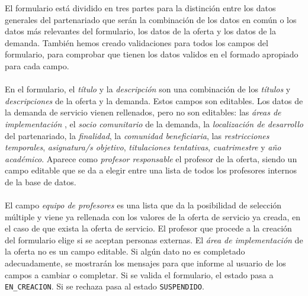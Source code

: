 \documentclass[11pt]{book}
\begin{document}
	El formulario está dividido en tres partes para la distinción entre los datos generales del partenariado que serán la combinación de los datos en común o los datos más relevantes del formulario, los datos de la oferta y los datos de la demanda. También hemos creado validaciones para todos los campos del formulario, para comprobar que tienen los datos validos en el formado apropiado para cada campo.\\\\
	En el formulario, el \emph{título} y la \emph{descripción } son una combinación de los \emph{títulos} y \emph{descripciones} de la oferta y la demanda. Estos campos son editables. Los datos de la demanda de servicio vienen rellenados, pero no son editables:  las \emph{áreas de implementación} , el \emph{socio comunitario} de la demanda, la \emph{localización de desarrollo} del partenariado, la \emph{finalidad}, la \emph{comunidad beneficiaria}, las \emph{restricciones temporales}, \emph{asignatura/s objetivo}, \emph{titulaciones tentativas}, \emph{cuatrimestre} y \emph{año académico}. Aparece como \emph{profesor responsable} el profesor de la oferta, siendo un campo editable que se da a elegir entre una lista de todos los profesores internos de la base de datos.\\\\
	El campo \emph{equipo de profesores} es una lista que da la posibilidad de selección múltiple y viene ya rellenada con los valores de la oferta de servicio ya creada, en el caso de que exista la oferta de servicio. El profesor que procede a la creación del formulario elige si se aceptan personas externas. El \emph{área de implementación} de la oferta no es un campo editable. Si algún dato no es completado adecuadamente, se mostrarán los mensajes para que informe al usuario de los campos a cambiar o completar. Si se valida el formulario, el estado pasa a \texttt{EN\_CREACION}. Si se rechaza pasa al estado \texttt{SUSPENDIDO}.
	\\\\
	
\end{document}
